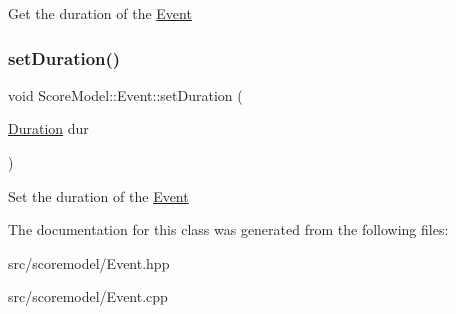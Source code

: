 Get the duration of the \mbox{\hyperlink{classScoreModel_1_1Event}{Event}} \mbox{\label{classScoreModel_1_1Event_a7f42996eca1339a85a8b6151bc426088}} 
\subsubsection{\texorpdfstring{setDuration()}{setDuration()}}
{\footnotesize\ttfamily void Score\+Model\+::\+Event\+::set\+Duration (\begin{DoxyParamCaption}\item[{\mbox{\hyperlink{classScoreModel_1_1Duration}{Duration}}}]{dur }\end{DoxyParamCaption})\hspace{0.3cm}{\ttfamily [inline]}}

Set the duration of the \mbox{\hyperlink{classScoreModel_1_1Event}{Event}} 

The documentation for this class was generated from the following files\+:\begin{DoxyCompactItemize}
\item 
src/scoremodel/Event.\+hpp\item 
src/scoremodel/Event.\+cpp\end{DoxyCompactItemize}

